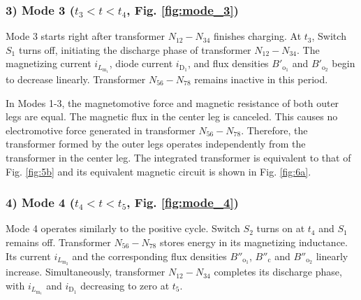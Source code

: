 \documentclass[lettersize,journal]{IEEEtran}
\begin{document}
\subsubsection*{\textup{3) Mode 3 ($t_3 < t < t_4$, \textup{Fig. \ref{fig:mode_3}})}}
Mode 3 starts right after transformer $N_{12}-N_{34}$ finishes charging. At $t_3$, Switch $S_1$ turns off, initiating the discharge phase of transformer $N_{12}-N_{34}$. The magnetizing current $i_{L_{\mathrm{m}_1}}$, diode current $i_{\mathrm{D}_1}$, and flux densities $B'_{\mathrm{o}_1}$ and $B'_{\mathrm{o}_2}$ begin to decrease linearly. Transformer $N_{56}-N_{78}$ remains inactive in this period. 

In Modes 1-3, the magnetomotive force and magnetic resistance of both outer legs are equal. The magnetic flux in the center leg is canceled. This causes no electromotive force generated in transformer $N_{56}-N_{78}$. Therefore, the transformer formed by the outer legs operates independently from the transformer in the center leg. The integrated transformer is equivalent to that of Fig. \ref{fig:5b} and its equivalent magnetic circuit is shown in Fig. \ref{fig:6a}.

\subsubsection*{\textup{4) Mode 4 ($t_4 < t < t_5$, \textup{Fig. \ref{fig:mode_4}})}}
Mode 4 operates similarly to the positive cycle. Switch $S_2$ turns on at $t_4$ and $S_1$ remains off. Transformer $N_{56}-N_{78}$ stores energy in its magnetizing inductance. Its current $i_{L_{\mathrm{m}_2}}$ and the corresponding flux densities $B''_{\mathrm{o}_1}$, $B''_{\mathrm{c}}$ and $B''_{\mathrm{o}_2}$ linearly increase. Simultaneously, transformer $N_{12}-N_{34}$ completes its discharge phase, with $i_{L_{\mathrm{m}_1}}$ and $i_{\mathrm{D}_1}$ decreasing to zero at $t_5$.
\end{document}
